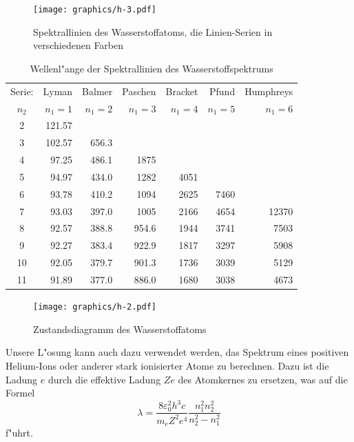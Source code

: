 \begin{figure}
\centering
\texttt{[image: graphics/h-3.pdf]}
\caption{Spektrallinien des Wasserstoffatoms, die Linien-Serien in
verschiedenen Farben
\label{skript:hspektrallinien}}
\end{figure}


\begin{table}
\begin{center}
\begin{tabular}{crrrrrr}
\hline
Serie:&  Lyman  &  Balmer & Paschen          & Bracket &  Pfund  & Humphreys \\
$n_2$ & $n_1=1$ & $n_1=2$ & $n_1=3$          & $n_1=4$ & $n_1=5$ & $n_1=6$   \\
\hline
    2 &  121.57 &         &                  &         &         &           \\
    3 &  102.57 &   656.3 &                  &         &         &           \\
    4 &   97.25 &   486.1 &  1875\phantom{.0}&         &         &           \\
    5 &   94.97 &   434.0 &  1282\phantom{.0}&  4051   &         &           \\
    6 &   93.78 &   410.2 &  1094\phantom{.0}&  2625   &   7460  &           \\
    7 &   93.03 &   397.0 &  1005\phantom{.0}&  2166   &   4654  & 12370     \\
    8 &   92.57 &   388.8 &   954.6          &  1944   &   3741  &  7503     \\
    9 &   92.27 &   383.4 &   922.9          &  1817   &   3297  &  5908     \\
   10 &   92.05 &   379.7 &   901.3          &  1736   &   3039  &  5129     \\
   11 &   91.89 &   377.0 &   886.0          &  1680   &   3038  &  4673     \\
\hline
\end{tabular}
\end{center}
\caption{Wellenl"ange der Spektrallinien des Wasserstoffspektrums
\label{skript:h2wellenlaengen}}
\end{table}

\begin{figure}
\centering
\texttt{[image: graphics/h-2.pdf]}
\caption{Zustandsdiagramm des Wasserstoffatoms
\label{skript:zustandsdiagramm}}
\end{figure}

Unsere L"osung kann auch dazu verwendet werden, das Spektrum eines
positiven Helium-Ions oder anderer stark ionisierter Atome zu berechnen.
Dazu ist die Ladung $e$ durch die effektive Ladung $Ze$ des Atomkernes
zu ersetzen, was auf die Formel
\[
\lambda = \frac{8\varepsilon_0^2h^3c}{m_eZ^2e^4}
\frac{n_1^2n_2^2}{n_2^2-n_1^2}
\]
f"uhrt.

